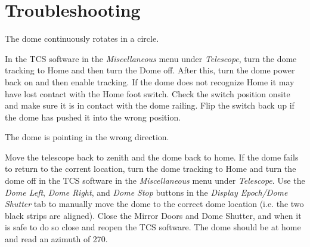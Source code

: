\documentclass[letterpaper,12pt]{article}
\begin{document}
\section{Troubleshooting}
\begin{shaded}\centering
	The dome continuously rotates in a circle.
\end{shaded}\noindent
In the TCS software in the \textit{Miscellaneous} menu under \textit{Telescope}, turn the dome tracking to Home and then turn the Dome off. After this, turn the dome power back on and then enable tracking. If the dome does not recognize Home it may have lost contact with the Home foot switch. Check the switch position onsite and make sure it is in contact with the dome railing. Flip the switch back up if the dome has pushed it into the wrong position.

\begin{shaded}\centering
	The dome is pointing in the wrong direction.
\end{shaded}\noindent
Move the telescope back to zenith and the dome back to home. If the dome fails to return to the corrent location, turn the dome tracking to Home and turn the dome off in the TCS software in the \textit{Miscellaneous} menu under \textit{Telescope}. Use the \textit{Dome Left}, \textit{Dome Right}, and \textit{Dome Stop} buttons in the \textit{Display Epoch/Dome Shutter} tab to manually move the dome to the correct dome location (i.e. the two black strips are aligned). Close the Mirror Doors and Dome Shutter, and when it is safe to do so close and reopen the TCS software. The dome should be at home and read an azimuth of 270.
\end{document}
